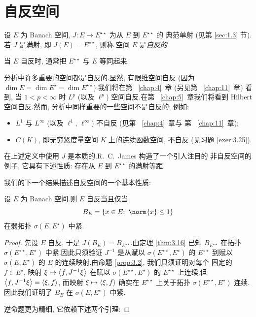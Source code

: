 \section{自反空间}
\label{sec:3.5}

\begin{definition}
设 $E$ 为 Banach 空间, $J:E\to E^{\star\star}$ 为从 $E$ 到 $E^{\star\star}$ 的
典范单射 (见第  \ref{sec:1.3} 节).若 $J$ 是满射, 即 $J(E)=E^{\star\star}$, 则称
空间 $E$ 是\emph{自反的}.
\end{definition}

当 $E$ 自反时, 通常把 $E^{\star\star}$ 与 $E$ 等同起来.

\begin{remark}
\label{rem:3.13}
分析中许多重要的空间都是自反的.显然, 有限维空间自反 (因为
$\dim E=\dim E^\star=\dim E^{\star\star}$).我们将在第~
\ref{chap:4}~章 (另见第~
\ref{chap:11}~章) 看到,
当 $1<p<\infty$ 时 $L^p$ (以及 $\ell^p$) 空间自反.在第~
\ref{chap:5}~章我们将看到 Hilbert
空间自反.然而, 分析中同样重要的一些空间不是自反的; 例如:
\begin{itemize}[leftmargin=1.6em, itemsep=0.15em]
	\item $L^1$ 与 $L^\infty$ (以及 $\ell^1$, $\ell^\infty$) 不自反 (见第~
\ref{chap:4}~章与
	      第~
\ref{chap:11}~章);
	\item $C(K)$, 即无穷紧度量空间 $K$ 上的连续函数空间, 不自反 (见习题
	       \ref{exer:3.25}).
\end{itemize}
\end{remark}

\begin{starremark}
\label{rem:3.14}
在上述定义中使用 $J$ 是本质的.R.~C.~James  构造了一个引人注目的
非自反空间的例子, 它具有下述性质: 存在从 $E$ 到 $E^{\star\star}$ 的满射等距.
\end{starremark}

我们的下一个结果描述自反空间的一个基本性质:

\begin{keytheorem}[Kakutani]
\label{thm:3.17}
设 $E$ 为 Banach 空间.则 $E$ 自反当且仅当
\begin{equation*}
B_E=\{x\in E;\ \norm{x}\le1\}
\end{equation*}
在弱拓扑 $\sigma(E,E^\star)$ 中紧.
\end{keytheorem}

\begin{proof}
先设 $E$ 自反, 于是 $J(B_E)=B_{E^{\star\star}}$.由定理  \ref{thm:3.16} 已知
$B_{E^{\star\star}}$ 在拓扑 $\sigma(E^{\star\star},E^\star)$ 中紧.因此只须验证
$J^{-1}$ 是从赋以 $\sigma(E^{\star\star},E^\star)$ 的 $E^{\star\star}$ 到赋以
$\sigma(E,E^\star)$ 的 $E$ 的连续映射.由命题  \ref{prop:3.2}, 我们只须证明对每个
固定的 $f\in E^\star$, 映射 $\xi\mapsto\left\langle f,J^{-1}\xi\right\rangle$ 在赋以
$\sigma(E^{\star\star},E^\star)$ 的 $E^{\star\star}$ 上连续.但
$\left\langle f,J^{-1}\xi\right\rangle=\left\langle \xi,f\right\rangle$, 而映射 $\xi\mapsto\left\langle \xi,f\right\rangle$ 确实在
$E^{\star\star}$ 上关于拓扑 $\sigma(E^{\star\star},E^\star)$ 连续.因此我们证明了
$B_E$ 在 $\sigma(E,E^\star)$ 中紧.

逆命题更为精细, 它依赖下述两个引理:
\end{proof}

